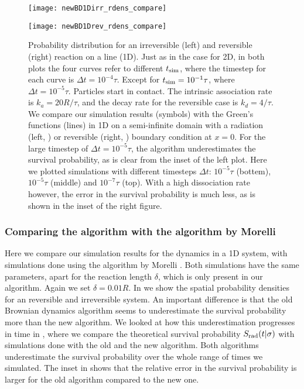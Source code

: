 \begin{figure}[hb]
\begin{minipage}[ht]{.5\linewidth}
\centering
\texttt{[image: newBD1Dirr\_rdens\_compare]}
\end{minipage}
\begin{minipage}[ht]{.5\linewidth}
\centering
\texttt{[image: newBD1Drev\_rdens\_compare]}
\end{minipage}
\caption{ Probability distribution for an irreversible (left) and reversible (right) reaction on a line (1D). Just as in the case for 2D, in both plots the four curves refer to different $t_{\rm sim}$, where the timestep for each curve is $\Delta t = 10^{-4} \tau$. Except for $t_{\rm sim}=10^{-1}\tau$, where $\Delta t=10^{-5}\tau$. Particles start in contact. The intrinsic association rate is $k_a=20 R/\tau$, and the decay rate for the reversible case is $k_d=4/\tau$. We compare our simulation results (symbols) with the Green's functions (lines) in 1D on a semi-infinite domain with a radiation (left, \cite{Beck1992}) or reversible (right, \cite{Agmon1984,Kim2001}) boundary condition at $x=0$. For the large timestep of $\Delta t = 10^{-5} \tau$, the algorithm underestimates the survival probability, as is clear from the inset of the left plot. Here we plotted simulations with different timesteps $\Delta t$: $10^{-5}\tau$ (bottem), $10^{-5}\tau$ (middle) and $10^{-7} \tau$ (top). With a high dissociation rate however, the error in the survival probability is much less, as is shown in the inset of the right figure.}
\end{figure}

\subsubsection{Comparing the algorithm with the algorithm by Morelli}
Here we compare our simulation results for the dynamics in a 1D system, with simulations done using the algorithm by Morelli \cite{Morelli2008a}. Both simulations have the same parameters, apart for the reaction length $\delta$, which is only present in our algorithm. Again we set $\delta=0.01R$. In  we show the spatial probability densities for an reversible and irreversible system. An important difference is that the old Brownian dynamics algorithm seems to underestimate the survival probability more than the new algorithm. We looked at how this underestimation progresses in time in , where we compare the theoretical survival probability $S_{\rm rad}(t|\sigma)$ with simulations done with the old and the new algorithm. Both algorithms underestimate the survival probability over the whole range of times we simulated. The inset in  shows that the relative error in the survival probability is larger for the old algorithm compared to the new one. 

